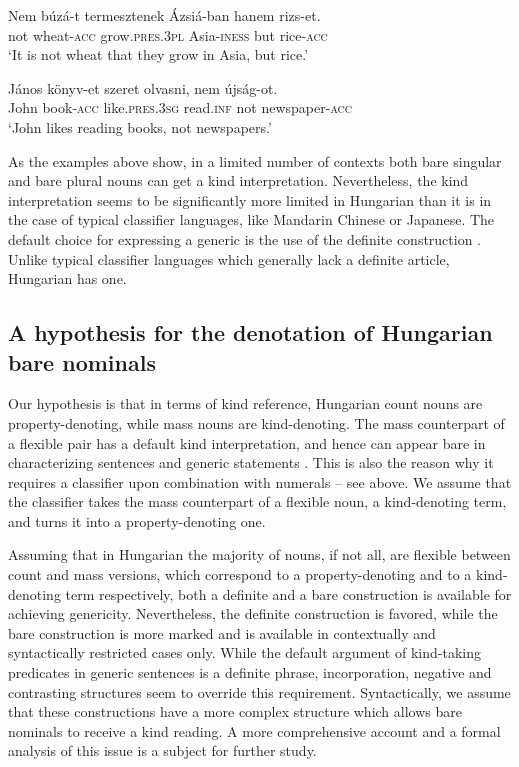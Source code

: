 \documentclass[output=paper]{langscibook}
\begin{document}
\ea \label{schv-nem:ex:48}
\gll Nem búzá-t termesztenek Ázsiá-ban hanem rizs-et.\\
not wheat-\textsc{acc} grow.\textsc{pres}.\textsc{3pl} Asia-\textsc{iness} but rice-\textsc{acc}\\
\glt `It is not wheat that they grow in Asia, but rice.' 
\z

\ea \label{schv-nem:ex:49}
\gll  János könyv-et szeret olvasni, nem újság-ot. \\
John book-\textsc{acc} like.\textsc{pres}.\textsc{3sg} read.\textsc{inf} not newspaper-\textsc{acc}\\
\glt `John likes reading books, not newspapers.' 
\z

\noindent As the examples above show, in a limited number of contexts both bare singular and bare plural nouns can get a kind interpretation. Nevertheless, the kind interpretation seems to be significantly more limited in Hungarian than it is in the case of typical classifier languages, like Mandarin Chinese or Japanese. The default choice for expressing a generic is the use of the definite construction . Unlike typical classifier languages which generally lack a definite article, Hungarian has one.

\subsection{A hypothesis for the denotation of Hungarian bare nominals} \label{schv-nem:sec:4.2}

Our hypothesis is that in terms of kind reference, Hungarian count nouns are property-denoting, while mass nouns are kind-denoting. The mass counterpart of a flexible pair has a default kind interpretation, and hence can appear bare in characterizing sentences  and generic statements . This is also the reason why it requires a classifier upon combination with numerals -- see  above. We assume that the classifier takes the mass counterpart of a flexible noun, a kind-denoting term, and turns it into a property-denoting one. 

Assuming that in Hungarian the majority of nouns, if not all, are flexible between count and mass versions, which correspond to a property-denoting and to a kind-denoting term respectively, both a definite and a bare construction is available for achieving genericity. Nevertheless, the definite construction is favored, while the bare construction is more marked and is available in contextually and syntactically restricted cases only. While the default argument of kind-taking predicates in generic sentences is a definite phrase, incorporation, negative and contrasting structures seem to override this requirement. Syntactically, we assume that these constructions have a more complex structure which allows bare nominals to receive a kind reading. A more comprehensive account and a formal analysis of this issue is a subject for further study. 
   
\end{document}
